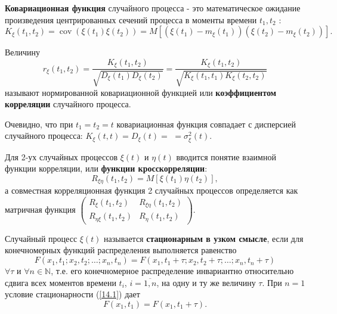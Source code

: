   
    \begin{definition}\label{smd_def_2} \textbf{Ковариационная функция} случайного процесса - это математическое ожидание произведения центрированных сечений процесса в моменты времени $t_1, t_2$ :
    $$
    K_{\xi}\left(t_1, t_2\right)=\operatorname{cov}\left(\xi\left(t_1\right) \xi\left(t_2\right)\right) = M\left[\left(\xi\left(t_1\right)-m_{\xi}\left(t_1\right)\right)\left(\xi\left(t_2\right)-m_{\xi}\left(t_2\right)\right)\right] .
    $$
    
    Величину
    $$
    r_{\xi}\left(t_1, t_2\right)=\frac{K_{\xi}\left(t_1, t_2\right)}{\sqrt{D_{\xi}\left(t_1\right) D_{\xi}\left(t_2\right)}}=\frac{K_{\xi}\left(t_1, t_2\right)}{\sqrt{K_{\xi}\left(t_1, t_1\right) K_{\xi}\left(t_2, t_2\right)}}
    $$
    называют нормированной ковариационной функцией или \textbf{коэффициентом корреляции} случайного процесса.
    
    Очевидно, что при $t_1=t_2=t$ ковариационная функция совпадает с дисперсией случайного процесса: $K_{\xi}(t, t)=D_{\xi}(t)=$ $=\sigma_{\xi}^2(t)$.
    
    Для 2-ух случайных процессов $\xi(t)$ и $\eta(t)$ вводится понятие взаимной функции корреляции, или \textbf{функции кросскорреляции}:
    $$
    R_{\xi \eta}\left(t_1, t_2\right)=M\left[\xi\left(t_1\right) \eta\left(t_2\right)\right],
    $$
    а совместная корреляционная функция 2 случайных процессов определяется как матричная функция $\left(\begin{array}{cc}R_{\xi}\left(t_1, t_2\right) & R_{\xi \eta}\left(t_1, t_2\right) \\ R_{\eta \xi}\left(t_1, t_2\right) & R_\eta\left(t_1, t_2\right)\end{array}\right)$.
	\end{definition}
    

    
    \begin{definition}\label{smd_def_3} Случайный процесс $\xi(t)$ называется \textbf{стационарным в узком смысле}, если для конечномерных функций распределения выполняется равенство
    \begin{equation}
            F\left(x_1, t_1 ; x_2, t_2 ; \ldots ; x_n, t_n\right)
    =F\left(x_1, t_1+\tau ; x_2, t_2+\tau ; \ldots ; x_n, t_n+\tau\right)
    \label{14.1}
    \end{equation}    
    $\forall \tau$ и $\forall n\in \mathbb{N}$, т.е. его конечномерное распределение инвариантно относительно сдвига всех моментов времени $t_i$, $i=\overline{1, n}$, на одну и ту же величину $\tau$.
     \newline При $n=1$ условие стационарности (\ref{14.1}) дает
    $$
    F\left(x_1, t_1\right)=F\left(x_1, t_1+\tau\right) .
    $$
    \end{definition}
    
